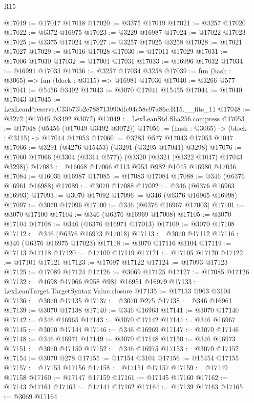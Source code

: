 \begin{lexlean}{R15}
\begin{coremodule}
@17019 := @17017 @17018
@17020 := @3375 @17019
@17021 := @3257 @17020
@17022 := @6372 @16975
@17023 := @3229 @16987
@17024 := @17022 @17023
@17025 := @3375 @17024
@17027 := @3257 @17025 @3258
@17028 := @17021 @17027
@17029 := @17016 @17028
@17030 := @17011 @17029
@17031 := @17006 @17030
@17032 := @17001 @17031
@17033 := @16996 @17032
@17034 := @16991 @17033
@17036 := @3257 @17034 @3258
@17039 := fun (hash : @3065) => fun (block : @3115) => @16981 @17036
@17040 := @3266 @577
@17041 := @5456 @3492
@17043 := @3070 @17041 @15455
@17044 := @17040 @17043
@17045 := LexLeanPreserve.C33b73b2e788713990dfe94c58c97a86e.R15.__fits_11
@17048 := @3272 (@17045 @3492 @3072)
@17049 := LexLeanStd.Sha256.compress
@17053 := @17048 (@5456 (@17049 @3492 @3072))
@17056 := (hash : @3065) -> (block : @3115) -> @17044 @17053
@17060 := @3283 @577 @17043 @17053 @1047
@17066 := @3291 (@4276 @15453) (@3291 (@3295 @17041) @3298)
@17076 := @17060 @17066 (@3304 (@3314 @577)) (@3320 (@3321 (@3322 @1047) @17043 @3298))
@17083 := @16068 @17066 @113 @953 @982 @1045 @16980 @17036
@17084 := @16036 @16987
@17085 := @17083 @17084
@17088 := @346 (@6376 @16961 @16988)
@17089 := @3070 @17088
@17092 := @346 (@6376 @16963 @16993)
@17093 := @3070 @17092
@17096 := @346 (@6376 @16965 @16998)
@17097 := @3070 @17096
@17100 := @346 (@6376 @16967 @17003)
@17101 := @3070 @17100
@17104 := @346 (@6376 @16969 @17008)
@17105 := @3070 @17104
@17108 := @346 (@6376 @16971 @17013)
@17109 := @3070 @17108
@17112 := @346 (@6376 @16973 @17018)
@17113 := @3070 @17112
@17116 := @346 (@6376 @16975 @17023)
@17118 := @3070 @17116 @3104
@17119 := @17113 @17118
@17120 := @17109 @17119
@17121 := @17105 @17120
@17122 := @17101 @17121
@17123 := @17097 @17122
@17124 := @17093 @17123
@17125 := @17089 @17124
@17126 := @3069 @17125
@17127 := @17085 @17126
@17132 := @4698 @17066 @958 @981 @16951 @16979
@17133 := LexLeanTarget.TargetSyntax.Value.closure
@17135 := @17133 @963 @3104
@17136 := @3070 @17135
@17137 := @3070 @275
@17138 := @346 @16961
@17139 := @3070 @17138
@17140 := @346 @16963
@17141 := @3070 @17140
@17142 := @346 @16965
@17143 := @3070 @17142
@17144 := @346 @16967
@17145 := @3070 @17144
@17146 := @346 @16969
@17147 := @3070 @17146
@17148 := @346 @16971
@17149 := @3070 @17148
@17150 := @346 @16973
@17151 := @3070 @17150
@17152 := @346 @16975
@17153 := @3070 @17152
@17154 := @3070 @278
@17155 := @17154 @3104
@17156 := @15454 @17155
@17157 := @17153 @17156
@17158 := @17151 @17157
@17159 := @17149 @17158
@17160 := @17147 @17159
@17161 := @17145 @17160
@17162 := @17143 @17161
@17163 := @17141 @17162
@17164 := @17139 @17163
@17165 := @3069 @17164

\end{coremodule}
\end{lexlean}
